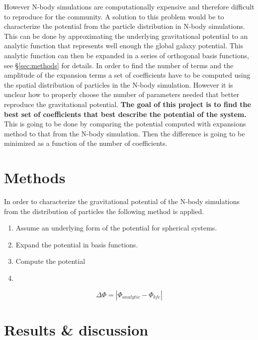 \documentclass[14pt]{article}
\begin{document}
However N-body simulations are computationally expensive and therefore difficult to 
reproduce for the community. A solution to this problem would be to
characterize the potential from the particle distribution in N-body
simulations. This can be done by approximating the underlying
gravitational potential to an analytic function that represents well
enough the global galaxy potential. This analytic function can then be
expanded in a series of orthogonal basis functions, see
\S \ref{sec:methods} for details. In order to find the number of terms
and the amplitude of the expansion terms a set of coefficients have to
be computed using the spatial distribution of particles in the N-body
simulation. However it is unclear how to properly choose the number of
parameters needed that better reproduce the gravitational potential.
\textbf{The goal of this project is to find the best set of coefficients
that best describe the potential of the system.}
This is going to be done by comparing the potential computed with
expansions method to that from the N-body simulation. Then the
difference is going to be minimized as a function of the number of
coefficients.

\section*{Methods}\label{sec:methods}

In order to characterize the gravitational potential of the N-body
simulations from the distribution of particles the following method is
applied.

\begin{enumerate}
\item Assume an underlying form of the potential for spherical
systems.

\item Expand the potential in basis functions.

\item Compute the potential

\item 

\end{enumerate}

\begin{equation}
\Delta \Phi = | \Phi_{analytic} - \Phi_{bfe} |
\end{equation}



\section*{Results \& discussion}
\end{document}
